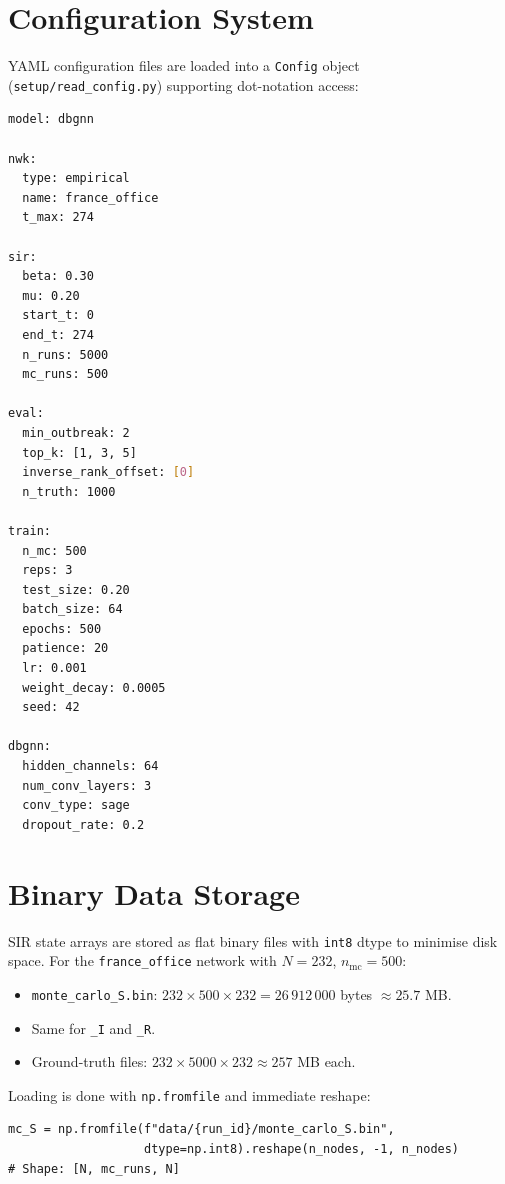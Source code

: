 \documentclass[12pt,a4paper]{report}
\begin{document}
\section{Configuration System}

YAML configuration files are loaded into a \texttt{Config} object
(\texttt{setup/read\_config.py}) supporting dot-notation access:
\begin{lstlisting}[language=bash,caption={Structure of a complete experiment config.}]
model: dbgnn

nwk:
  type: empirical
  name: france_office
  t_max: 274

sir:
  beta: 0.30
  mu: 0.20
  start_t: 0
  end_t: 274
  n_runs: 5000
  mc_runs: 500

eval:
  min_outbreak: 2
  top_k: [1, 3, 5]
  inverse_rank_offset: [0]
  n_truth: 1000

train:
  n_mc: 500
  reps: 3
  test_size: 0.20
  batch_size: 64
  epochs: 500
  patience: 20
  lr: 0.001
  weight_decay: 0.0005
  seed: 42

dbgnn:
  hidden_channels: 64
  num_conv_layers: 3
  conv_type: sage
  dropout_rate: 0.2
\end{lstlisting}

\section{Binary Data Storage}

SIR state arrays are stored as flat binary files with \texttt{int8} dtype to
minimise disk space. For the \texttt{france\_office} network with $N=232$,
$n_{\text{mc}}=500$:
\begin{itemize}[noitemsep]
  \item \texttt{monte\_carlo\_S.bin}: $232 \times 500 \times 232 = 26\,912\,000$ bytes $\approx 25.7$ MB.
  \item Same for \texttt{\_I} and \texttt{\_R}.
  \item Ground-truth files: $232 \times 5000 \times 232 \approx 257$ MB each.
\end{itemize}

Loading is done with \texttt{np.fromfile} and immediate reshape:
\begin{lstlisting}[caption={Binary array loading (from \texttt{setup/data\_loader.py}).}]
mc_S = np.fromfile(f"data/{run_id}/monte_carlo_S.bin",
                   dtype=np.int8).reshape(n_nodes, -1, n_nodes)
# Shape: [N, mc_runs, N]
\end{lstlisting}
\end{document}
